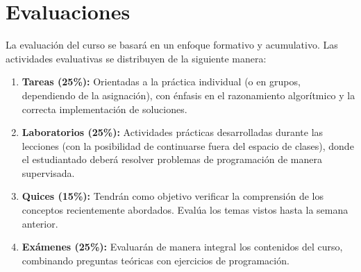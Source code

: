 \section{Evaluaciones}

La evaluación del curso se basará en un enfoque formativo y acumulativo.
Las actividades evaluativas se distribuyen de la siguiente manera:

\begin{enumerate}
  \item \textbf{Tareas (25\%):} Orientadas a la práctica individual (o en grupos, dependiendo de la asignación), con énfasis en el razonamiento algorítmico y la correcta implementación de soluciones.
  \item \textbf{Laboratorios (25\%):} Actividades prácticas desarrolladas durante las lecciones (con la posibilidad de continuarse fuera del espacio de clases), donde el estudiantado deberá resolver problemas de programación de manera supervisada.
  \item \textbf{Quices (15\%):} Tendrán como objetivo verificar la comprensión de los conceptos recientemente abordados. Evalúa los temas vistos hasta la semana anterior.
  \item \textbf{Exámenes (25\%):} Evaluarán de manera integral los contenidos del curso, combinando preguntas teóricas con ejercicios de programación.
\end{enumerate}

